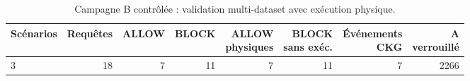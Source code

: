 \begin{table}[!t]
\centering
\caption{Campagne B contrôlée : validation multi-dataset avec exécution physique.}
\scriptsize
\setlength{\tabcolsep}{2pt}
\begin{tabular}{@{}lrrrrrrr@{}}
\toprule
Scénarios & Requêtes & ALLOW & BLOCK & \shortstack{ALLOW\\physiques} & \shortstack{BLOCK\\sans exéc.} & \shortstack{Événements\\CKG} & \shortstack{A\\verrouillé} \\
\midrule
3 & 18 & 7 & 11 & 7 & 11 & 7 & 2266 \\
\bottomrule
\end{tabular}
\normalsize
\label{tab:campaign-b-controlled}
\end{table}
